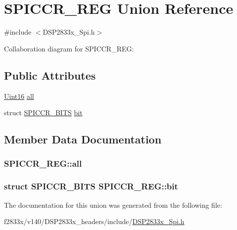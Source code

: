 \hypertarget{union_s_p_i_c_c_r___r_e_g}{}\section{S\+P\+I\+C\+C\+R\+\_\+\+R\+E\+G Union Reference}
\label{union_s_p_i_c_c_r___r_e_g}


{\ttfamily \#include $<$D\+S\+P2833x\+\_\+\+Spi.\+h$>$}



Collaboration diagram for S\+P\+I\+C\+C\+R\+\_\+\+R\+E\+G\+:
\subsection*{Public Attributes}
\begin{DoxyCompactItemize}
\item 
\hyperlink{_d_s_p2833x___device_8h_a59a9f6be4562c327cbfb4f7e8e18f08b}{Uint16} \hyperlink{union_s_p_i_c_c_r___r_e_g_a6fd777d7d23aed29cf18597eb428bd11}{all}
\item 
struct \hyperlink{struct_s_p_i_c_c_r___b_i_t_s}{S\+P\+I\+C\+C\+R\+\_\+\+B\+I\+T\+S} \hyperlink{union_s_p_i_c_c_r___r_e_g_a8b82af8b9705b22c6978ffbeb959042d}{bit}
\end{DoxyCompactItemize}


\subsection{Member Data Documentation}
\hypertarget{union_s_p_i_c_c_r___r_e_g_a6fd777d7d23aed29cf18597eb428bd11}{}
\subsubsection[{all}]{ S\+P\+I\+C\+C\+R\+\_\+\+R\+E\+G\+::all}\label{union_s_p_i_c_c_r___r_e_g_a6fd777d7d23aed29cf18597eb428bd11}
\hypertarget{union_s_p_i_c_c_r___r_e_g_a8b82af8b9705b22c6978ffbeb959042d}{}
\subsubsection[{bit}]{\setlength{\rightskip}{0pt plus 5cm}struct {\bf S\+P\+I\+C\+C\+R\+\_\+\+B\+I\+T\+S} S\+P\+I\+C\+C\+R\+\_\+\+R\+E\+G\+::bit}\label{union_s_p_i_c_c_r___r_e_g_a8b82af8b9705b22c6978ffbeb959042d}


The documentation for this union was generated from the following file\+:\begin{DoxyCompactItemize}
\item 
f2833x/v140/\+D\+S\+P2833x\+\_\+headers/include/\hyperlink{_d_s_p2833x___spi_8h}{D\+S\+P2833x\+\_\+\+Spi.\+h}\end{DoxyCompactItemize}
